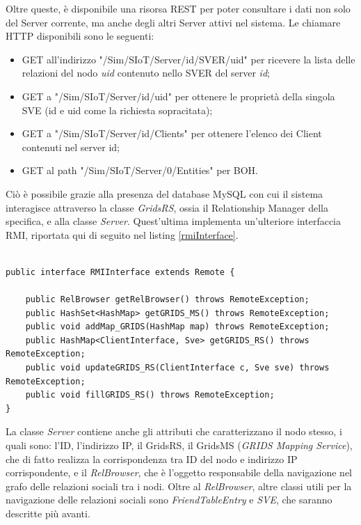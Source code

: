 Oltre queste, è disponibile una risorsa REST per poter consultare i dati non solo del Server corrente, ma anche degli altri Server attivi nel sistema. Le chiamare HTTP disponibili sono le seguenti:

\begin{itemize}
    \item GET all'indirizzo "/Sim/SIoT/Server/{id}/SVER/{uid}" per ricevere la lista delle relazioni del nodo \textit{uid} contenuto nello SVER del server \textit{id};
    \item GET a "/Sim/SIoT/Server/{id}/{uid}" per ottenere le proprietà della singola SVE (id e uid come la richiesta sopracitata);
    \item GET a "/Sim/SIoT/Server/{id}/Clients" per ottenere l'elenco dei Client contenuti nel server {id};
    \item GET al path "/Sim/SIoT/Server/0/Entities" per BOH. 
    
\end{itemize}

Ciò è possibile grazie alla presenza del database MySQL con cui il sistema interagisce attraverso la classe \textit{GridsRS}, ossia il Relationship Manager della specifica, e alla classe \textit{Server}. Quest'ultima implementa un'ulteriore interfaccia RMI, riportata qui di seguito nel listing \ref{rmiInterface}.




\begin{lstlisting}[caption={RMIInterface.java},label={rmiInterface},style={c}]

public interface RMIInterface extends Remote {

    public RelBrowser getRelBrowser() throws RemoteException;
    public HashSet<HashMap> getGRIDS_MS() throws RemoteException;
    public void addMap_GRIDS(HashMap map) throws RemoteException;
    public HashMap<ClientInterface, Sve> getGRIDS_RS() throws RemoteException;
    public void updateGRIDS_RS(ClientInterface c, Sve sve) throws RemoteException;
    public void fillGRIDS_RS() throws RemoteException;
}
\end{lstlisting}

La classe \textit{Server} contiene anche gli attributi che caratterizzano il nodo stesso, i quali sono: l'ID, l'indirizzo IP, il GridsRS, il GridsMS (\textit{GRIDS Mapping Service}), che di fatto realizza la corrispondenza tra ID del nodo e indirizzo IP corrispondente, e il \textit{RelBrowser}, che è l'oggetto responsabile della navigazione nel grafo delle relazioni sociali tra i nodi.
Oltre al \textit{RelBrowser}, altre classi utili per la navigazione delle relazioni sociali sono \textit{FriendTableEntry} e \textit{SVE}, che saranno descritte più avanti.


